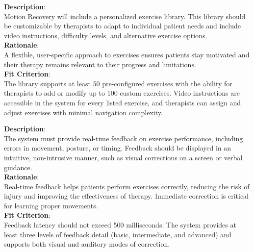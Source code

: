 \begin{tcolorbox}[minimalcard]
    \raggedright\textbf{Description}: \vspace{6pt}\\
    Motion Recovery will include a personalized exercise library. This library should be customizable by therapists to adapt to individual patient needs and include video instructions, difficulty levels, and alternative exercise options.\\
    \vspace{6pt}
    \textbf{Rationale}: \vspace{6pt}\\
    A flexible, user-specific approach to exercises ensures patients stay motivated and their therapy remains relevant to their progress and limitations.\\
    \vspace{6pt}
    \textbf{Fit Criterion}: \vspace{6pt}\\
    The library supports at least 50 pre-configured exercises with the ability for therapists to add or modify up to 100 custom exercises. Video instructions are accessible in the system for every listed exercise, and therapists can assign and adjust exercises with minimal navigation complexity.
\end{tcolorbox}

\begin{tcolorbox}[minimalcard]
    \raggedright\textbf{Description}: \vspace{6pt}\\
    The system must provide real-time feedback on exercise performance, including errors in movement, posture, or timing. Feedback should be displayed in an intuitive, non-intrusive manner, such as visual corrections on a screen or verbal guidance.\\
    \vspace{6pt}
    \textbf{Rationale}: \vspace{6pt}\\
    Real-time feedback helps patients perform exercises correctly, reducing the risk of injury and improving the effectiveness of therapy. Immediate correction is critical for learning proper movements.\\
    \vspace{6pt}
    \textbf{Fit Criterion}: \vspace{6pt}\\
    Feedback latency should not exceed 500 milliseconds. The system provides at least three levels of feedback detail (basic, intermediate, and advanced) and supports both visual and auditory modes of correction.
\end{tcolorbox}
\vfill
